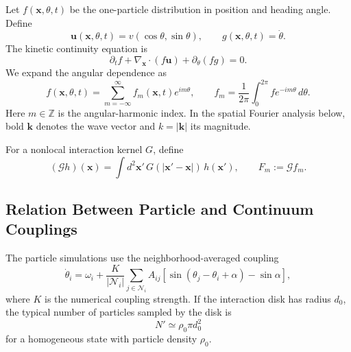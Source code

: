 \documentclass[11pt]{article}
\numberwithin{equation}{section}
\begin{document}
Let $f(\mathbf x,\theta,t)$ be the one-particle distribution in position
and heading angle. Define
\begin{equation}
  \mathbf u(\mathbf x,\theta,t)=v(\cos\theta,\sin\theta),
  \qquad
  g(\mathbf x,\theta,t)=\dot\theta .
\end{equation}
The kinetic continuity equation is
\begin{equation}
  \partial_t f+\nabla_{\mathbf x}\cdot(f\mathbf u)+\partial_\theta(fg)=0.
  \label{eq:kinetic_continuity}
\end{equation}
We expand the angular dependence as
\begin{equation}
  f(\mathbf x,\theta,t)=\sum_{m=-\infty}^{\infty}f_m(\mathbf x,t)e^{im\theta},
  \qquad
  f_m=\frac{1}{2\pi}\int_0^{2\pi}f e^{-im\theta}\,d\theta .
  \label{eq:angular_modes}
\end{equation}
Here $m\in\mathbb Z$ is the angular-harmonic index. In the spatial
Fourier analysis below, bold $\mathbf k$ denotes the wave vector and
$k=|\mathbf k|$ its magnitude.

For a nonlocal interaction kernel $G$, define
\begin{equation}
  (\mathcal G h)(\mathbf x)=
  \int d^2\mathbf x'\,G(|\mathbf x'-\mathbf x|)\,h(\mathbf x'),
  \qquad
  F_m:=\mathcal G f_m .
\end{equation}

\subsection{Relation Between Particle and Continuum Couplings}

The particle simulations use the neighborhood-averaged coupling
\begin{equation}
  \dot\theta_i=\omega_i+
  \frac{K}{|\mathcal N_i|}
  \sum_{j\in\mathcal N_i}A_{ij}
  [\sin(\theta_j-\theta_i+\alpha)-\sin\alpha],
  \label{eq:particle_coupling_appendix}
\end{equation}
where $K$ is the numerical coupling strength. If the interaction disk has
radius $d_0$, the typical number of particles sampled by the disk is
\begin{equation}
  N'\simeq \rho_0\pi d_0^2
\end{equation}
for a homogeneous state with particle density $\rho_0$.
\end{document}
